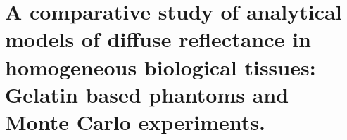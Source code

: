 





% 

\chapter[A comparative study of single layer analytical models]{A comparative study of analytical models of diffuse reflectance in homogeneous biological tissues: Gelatin based phantoms and Monte Carlo experiments.}\label{chap:1layer}




